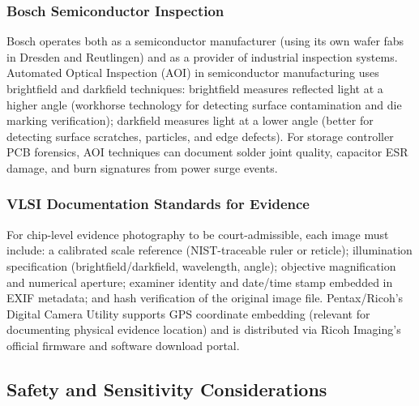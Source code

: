 \documentclass[11pt,letterpaper]{article}
\begin{document}
\subsubsection{Bosch Semiconductor Inspection}

Bosch operates both as a semiconductor manufacturer (using its own wafer fabs in Dresden and Reutlingen) and as a provider of industrial inspection systems. Automated Optical Inspection (AOI) in semiconductor manufacturing uses brightfield and darkfield techniques: brightfield measures reflected light at a higher angle (workhorse technology for detecting surface contamination and die marking verification); darkfield measures light at a lower angle (better for detecting surface scratches, particles, and edge defects). For storage controller PCB forensics, AOI techniques can document solder joint quality, capacitor ESR damage, and burn signatures from power surge events.

\subsubsection{VLSI Documentation Standards for Evidence}

For chip-level evidence photography to be court-admissible, each image must include: a calibrated scale reference (NIST-traceable ruler or reticle); illumination specification (brightfield/darkfield, wavelength, angle); objective magnification and numerical aperture; examiner identity and date/time stamp embedded in EXIF metadata; and hash verification of the original image file. Pentax/Ricoh's Digital Camera Utility supports GPS coordinate embedding (relevant for documenting physical evidence location) and is distributed via Ricoh Imaging's official firmware and software download portal.

\subsection{Safety and Sensitivity Considerations}
\end{document}
